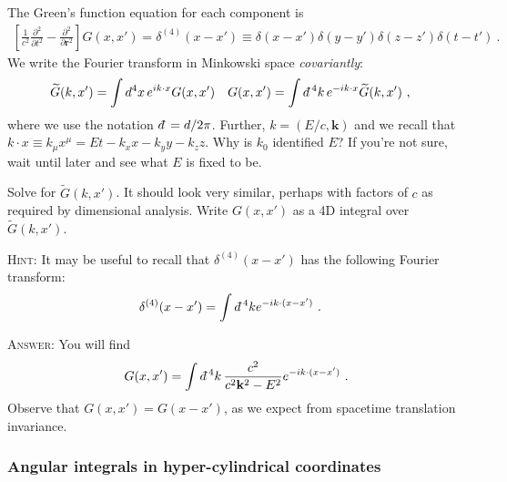 \documentclass[12pt]{article}
\numberwithin{equation}{subsection}    %
\renewcommand{\tilde}{\widetilde}   %
\renewcommand{\vec}[1]{\mathbf{#1}} %
\newcommand{\dbar}{d\mkern-6mu\mathchar'26}    %
\begin{document}
The Green's function equation for each component is
\begin{align}
	\left[\frac{1}{c^2}\frac{\partial^2}{\partial t^2} - \frac{\partial^2}{\partial \vec{r}^2}\right] G(x,x') = \delta^{(4)}(x-x') \equiv \delta(x-x')\delta(y-y')\delta(z-z')\delta(t-t') \ .
	\label{eq:4D:define:G}
\end{align}
We write the Fourier transform in Minkowski space \emph{covariantly}:
\begin{align}
	\tilde G(k,x') &= \int d^4x \, e^{ik\cdot x} G(x,x')
	&
	G(x,x') &= \int \dbar^4k \, e^{-ik\cdot x} \tilde G(k,x') \ ,
\end{align}
where we use the notation $\dbar = d/2\pi$. Further, $k = (E/c,\vec k)$ and we recall that $k\cdot x \equiv k_\mu x^\mu = Et - k_x x - k_y y - k_z z$. 
Why is $k_0$ identified $E$? If you're not sure, wait until later and see what $E$ is fixed to be. 

Solve for $\tilde G(k,x')$. It should look very similar, perhaps with factors of $c$ as required by dimensional analysis.  Write $G(x,x')$ as a 4D integral over $\tilde G(k,x')$.

\textsc{Hint:} It may be useful to recall that $\delta^{(4)}(x-x')$ has the following Fourier transform: 
\begin{align}
	\delta^{(4)}(x-x') &= \int \dbar^4 k e^{-ik\cdot (x-x')} \ .
\end{align}

\textsc{Answer:} You will find
\begin{align}
	G(x,x') = \int \dbar^4k \, \frac{c^2}{c^2 \vec k^2 - E^2} e^{-ik\cdot (x-x')} \ .
	\label{eq:G:ft:1}
\end{align} 
Observe that $G(x,x') = G(x-x')$, as we expect from spacetime translation invariance.



\subsubsection{Angular integrals in hyper-cylindrical coordinates}
\end{document}
